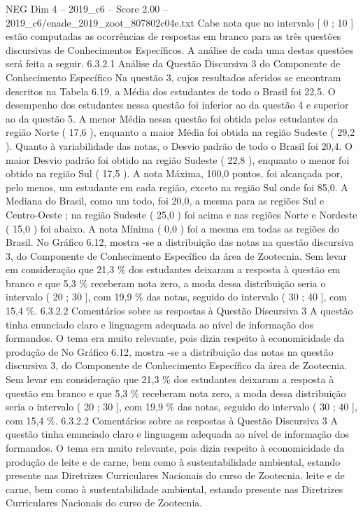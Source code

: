 \begin{textsample}{NEG Dim 4 – 2019\_c6 – Score 2.00 – 2019\_c6/enade\_2019\_zoot\_807802c04e.txt}
Cabe nota que no intervalo [ 0 ; 10 ] estão computadas as ocorrências de respostas em branco para as três questões discursivas de Conhecimentos Específicos.
A análise de cada uma destas questões será feita a seguir. 6.3.2.1 Análise da Questão Discursiva 3 do Componente de Conhecimento Específico Na questão 3, cujos resultados aferidos se encontram descritos na Tabela 6.19, a Média dos estudantes de todo o Brasil foi 22,5.
O desempenho dos estudantes nessa questão foi inferior ao da questão 4 e superior ao da questão 5.
A menor Média nessa questão foi obtida pelos estudantes da região Norte ( 17,6 ), enquanto a maior Média foi obtida na região Sudeste ( 29,2 ).
Quanto à variabilidade das notas, o Desvio padrão de todo o Brasil foi 20,4.
O maior Desvio padrão foi obtido na região Sudeste ( 22,8 ), enquanto o menor foi obtido na região Sul ( 17,5 ).
A nota Máxima, 100,0 pontos, foi alcançada por, pelo menos, um estudante em cada região, exceto na região Sul onde foi 85,0.
A Mediana do Brasil, como um todo, foi 20,0, a mesma para as regiões Sul e Centro-Oeste ; na região Sudeste ( 25,0 ) foi acima e nas regiões Norte e Nordeste ( 15,0 ) foi abaixo.
A nota Mínima ( 0,0 ) foi a mesma em todas as regiões do Brasil.
No Gráfico 6.12, mostra -se a distribuição das notas na questão discursiva 3, do Componente de Conhecimento Específico da área de Zootecnia.
Sem levar em consideração que 21,3 \% dos estudantes deixaram a resposta à questão em branco e que 5,3 \% receberam nota zero, a moda dessa distribuição seria o intervalo ( 20 ; 30 ], com 19,9 \% das notas, seguido do intervalo ( 30 ; 40 ], com 15,4 \%. 6.3.2.2 Comentários sobre as respostas à Questão Discursiva 3 A questão tinha enunciado claro e linguagem adequada ao nível de informação dos formandos.
O tema era muito relevante, pois dizia respeito à economicidade da produção de No Gráfico 6.12, mostra -se a distribuição das notas na questão discursiva 3, do Componente de Conhecimento Específico da área de Zootecnia.
Sem levar em consideração que 21,3 \% dos estudantes deixaram a resposta à questão em branco e que 5,3 \% receberam nota zero, a moda dessa distribuição seria o intervalo ( 20 ; 30 ], com 19,9 \% das notas, seguido do intervalo ( 30 ; 40 ], com 15,4 \%. 6.3.2.2 Comentários sobre as respostas à Questão Discursiva 3 A questão tinha enunciado claro e linguagem adequada ao nível de informação dos formandos.
O tema era muito relevante, pois dizia respeito à economicidade da produção de leite e de carne, bem como à sustentabilidade ambiental, estando presente nas Diretrizes Curriculares Nacionais do curso de Zootecnia. leite e de carne, bem como à sustentabilidade ambiental, estando presente nas Diretrizes Curriculares Nacionais do curso de Zootecnia.

\end{textsample}
